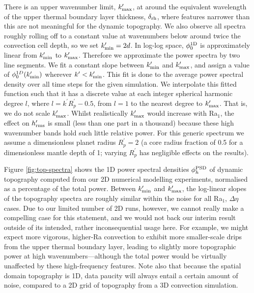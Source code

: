\documentclass[trackchanges]{aastex63}
\begin{document}
There is an upper wavenumber limit, $k^\prime_{\rm max}$, at around the equivalent wavelength of the upper thermal boundary layer thickness, $\delta_{\rm rh}$, where features narrower than this are not meaningful for the dynamic topography. We also observe all spectra roughly rolling off to a constant value at wavenumbers below around twice the convection cell depth, so we set $k_{\rm min}^\prime = 2d$. In log-log space, $\phi^{\rm 1D}_0$ is approximately linear from $k_{\rm min}^\prime$ to $k^\prime_{\rm max}$. Therefore we approximate the power spectra by two line segments. We fit a constant slope between $k^\prime_{\rm min}$ and $k^\prime_{\rm max}$, and assign a value of $\phi^{1D}_0(k^\prime_{\rm min})$ wherever $k^\prime < k^\prime_{\rm min}$. This fit is done to the average power spectral density over all time steps for the given simulation. We interpolate this fitted function such that it has a discrete value at each integer spherical harmonic degree $l$, where $l = k^\prime R_p^\prime - 0.5$, from $l=1$ to the nearest degree to $k^\prime_{\rm max}$. That is, we do not scale $k^\prime_{\rm max}$. Whilst realistically $k^\prime_{\rm max}$ would increase with Ra$_1$, the effect on $h_{\rm rms}^\prime$ is small (less than one part in a thousand) because these high wavenumber bands hold such little relative power. For this generic spectrum we assume a dimensionless planet radius $R_p^\prime = 2$ (a core radius fraction of 0.5 for a dimensionless mantle depth of 1; varying $R_p^\prime$ has negligible effects on the results).


Figure \ref{fig:top-spectra} shows the 1D power spectral densities $\phi^{\rm PSD}_h$ of dynamic topography computed from our 2D numerical modelling experiments, normalised as a percentage of the total power. Between $k_{\rm min}^\prime$ and $k_{\rm max}^\prime$, the log-linear slopes of the topography spectra are roughly similar within the noise for all Ra$_1$, $\Delta \eta$ cases. Due to our limited number of 2D runs, however, we cannot really make a compelling case for this statement, and we would not back our interim result outside of its intended, rather inconsequential usage here. For example, we might expect more vigorous, higher-Ra convection to exhibit more smaller-scale drips from the upper thermal boundary layer, leading to slightly more topographic power at high wavenumbers---although the total power would be virtually unaffected by these high-frequency features. Note also that because the spatial domain topography is 1D, data paucity will always entail a certain amount of noise, compared to a 2D grid of topography from a 3D convection simulation.
\end{document}
